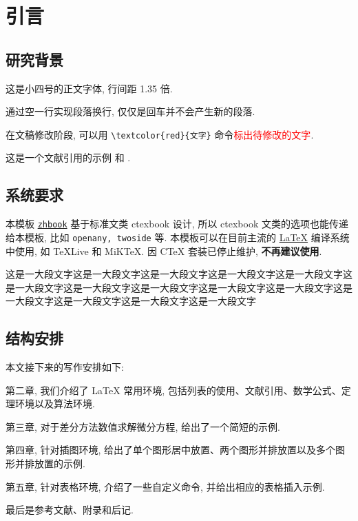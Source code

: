 

\chapter{引言}\label{chap:Intro}

\section{研究背景}\label{sec:background}

这是小四号的正文字体, 行间距 1.35 倍.

通过空一行实现段落换行, 仅仅是回车并不会产生新的段落.

在文稿修改阶段, 可以用 \verb|\textcolor{red}{文字}| 命令\textcolor{red}{标出待修改的文字}.

这是一个文献引用的示例 \cite{Tadmor2012} 和 \cite{LiLiu1997,Adams2003,TreWei2014}.

\section{系统要求}
本模板 \href{https://github.com/andy123t/zhbook}{\texttt{zhbook}} 基于标准文类 ctexbook 设计, 所以 ctexbook 文类的选项也能传递给本模板, 比如 \lstinline{openany, twoside} 等. 本模板可以在目前主流的 \href{https://en.wikibooks.org/wiki/LaTeX/Introduction}{\LaTeX{}} 编译系统中使用, 如 \TeX{}Live 和 MiK\TeX{}. 因 C\TeX{} 套装已停止维护, \textbf{不再建议使用}.

这是一大段文字这是一大段文字这是一大段文字这是一大段文字这是一大段文字这是一大段文字这是一大段文字这是一大段文字这是一大段文字这是一大段文字这是一大段文字这是一大段文字这是一大段文字这是一大段文字


\section{结构安排}

本文接下来的写作安排如下:

第二章, 我们介绍了 LaTeX 常用环境, 包括列表的使用、文献引用、数学公式、定理环境以及算法环境.

第三章, 对于差分方法数值求解微分方程, 给出了一个简短的示例.

第四章, 针对插图环境, 给出了单个图形居中放置、两个图形并排放置以及多个图形并排放置的示例.

第五章, 针对表格环境, 介绍了一些自定义命令, 并给出相应的表格插入示例.

最后是参考文献、附录和后记.

